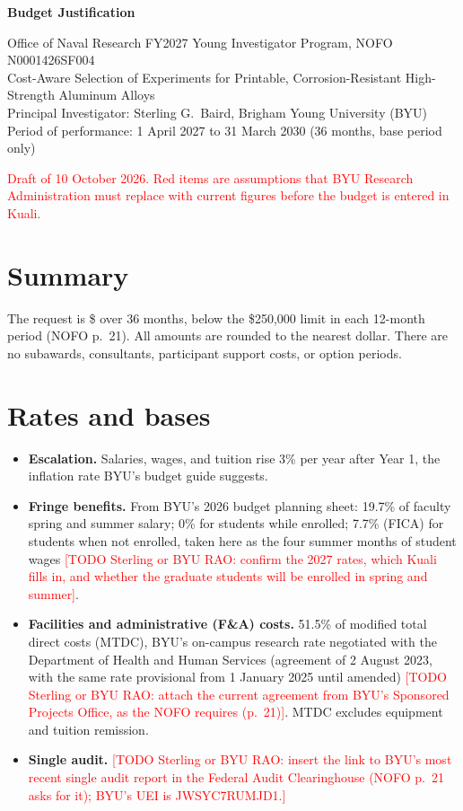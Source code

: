 \documentclass[11pt,letterpaper]{article}
\newcommand{\todo}[1]{\textcolor{red}{[TODO Sterling or BYU RAO: #1]}}
\begin{document}
\begin{center}
{\large\bfseries Budget Justification\par}
\vspace{4pt}
Office of Naval Research FY2027 Young Investigator Program, NOFO N0001426SF004\\
Cost-Aware Selection of Experiments for Printable, Corrosion-Resistant
High-Strength Aluminum Alloys\\
Principal Investigator: Sterling G.\ Baird, Brigham Young University (BYU)\\
Period of performance: 1 April 2027 to 31 March 2030 (36 months, base period only)
\end{center}

\textcolor{red}{Draft of 10 October 2026. Red items are assumptions that
BYU Research Administration must replace with current figures before the
budget is entered in Kuali.}

\section*{Summary}

The request is \$\BudgetTotal{} over 36 months, below the \$250,000 limit in each
12-month period (NOFO p.~21). All amounts are rounded to the nearest dollar.
There are no subawards, consultants, participant support costs, or option
periods.

\begin{center}

\end{center}

\section*{Rates and bases}

\begin{itemize}\setlength{\itemsep}{1pt}
\item \textbf{Escalation.} Salaries, wages, and tuition rise 3\% per year
after Year 1, the inflation rate BYU's budget guide suggests.
\item \textbf{Fringe benefits.} From BYU's 2026 budget planning sheet: 19.7\%
of faculty spring and summer salary; 0\% for students while enrolled; 7.7\%
(FICA) for students when not enrolled, taken here as the four summer months
of student wages \todo{confirm the 2027 rates, which Kuali fills in, and
whether the graduate students will be enrolled in spring and summer}.
\item \textbf{Facilities and administrative (F\&A) costs.} 51.5\% of modified
total direct costs (MTDC), BYU's on-campus research rate negotiated with the
Department of Health and Human Services (agreement of 2 August 2023, with
the same rate provisional from 1 January 2025 until amended)
\todo{attach the current agreement from BYU's Sponsored Projects Office, as
the NOFO requires (p.~21)}. MTDC excludes equipment and tuition remission.
\item \textbf{Single audit.} \todo{insert the link to BYU's most recent
single audit report in the Federal Audit Clearinghouse (NOFO p.~21 asks for
it); BYU's UEI is JWSYC7RUMJD1.}
\end{itemize}
\end{document}
